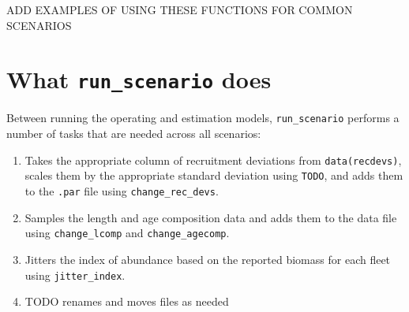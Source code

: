 \documentclass[12pt]{article}
\begin{document}
ADD EXAMPLES OF USING THESE FUNCTIONS FOR COMMON SCENARIOS

\section*{What \texttt{run\_scenario} does}

Between running the operating and estimation models, \texttt{run\_scenario}
performs a number of tasks that are needed across all scenarios:

\begin{enumerate}
  \item Takes the appropriate column of recruitment deviations from
    \texttt{data(recdevs)}, scales them by the appropriate standard deviation
    using \texttt{TODO}, and adds them to the \texttt{.par} file using
    \texttt{change\_rec\_devs}.
  \item Samples the length and age composition data and adds them to the data
    file using \texttt{change\_lcomp} and \texttt{change\_agecomp}.
  \item Jitters the index of abundance based on the reported biomass for each
    fleet using \texttt{jitter\_index}.
  \item TODO renames and moves files as needed
\end{enumerate}







%
\end{document}
